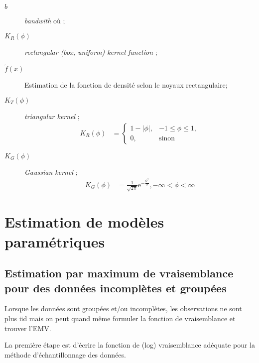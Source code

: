 \documentclass[10pt, french]{article}
\begin{document}
\begin{multicols*}{2}
\begin{distributions}[Notation]
\begin{description}
	\item[$b$]	\og \textit{bandwith} \fg{} où ;
	\item[$K_{R}(\phi)$]	\og \textit{rectangular (box, uniform) kernel function} \fg{};
	\item[$\tilde{f}(x)$]	Estimation de la fonction de densité selon le noyaux rectangulaire;
	\item[$K_{T}(\phi)$]	\og \textit{triangular kernel} \fg{};
	\begin{align*}
		K_{R}(\phi)
		&=	\begin{cases}
			1 - |\phi|,	&	-1	\leq		\phi	\leq		1,	\\
			0,	&	\text{sinon}
			\end{cases}	
	\end{align*}
	\item[$K_{G}(\phi)$]	\og \textit{Gaussian kernel} \fg{};
		\begin{align*}
		K_{G}(\phi)
		&=	\frac{1}{\sqrt{2\pi}} \textrm{e}^{-\frac{\phi^{2}}{2}}, -\infty	<	\phi	<	\infty
		\end{align*}
\end{description}
\end{distributions}


\pagebreak
\section{Estimation de modèles paramétriques}
\subsection*{Estimation par maximum de vraisemblance pour des données incomplètes et groupées}
Lorsque les données sont groupées et/ou incomplètes, les observations ne sont plus iid mais on peut quand même formuler la fonction de vraisemblance et trouver l'EMV.

La première étape est d'écrire la fonction de (log) vraisemblance adéquate pour la méthode d'échantillonnage des données.\\


\end{multicols*}
\end{document}
